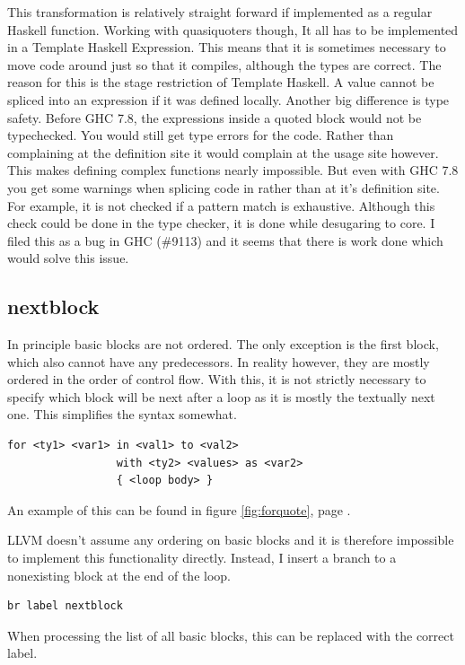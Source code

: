 \documentclass[a4paper,bibliography=totocnumbered,parskip,headsepline]{scrbook}
\begin{document}
This transformation is relatively straight forward if implemented as a regular Haskell function.
Working with quasiquoters though, It all has to be implemented in a Template Haskell Expression.
This means that it is sometimes necessary to move code around just so that it compiles, although the types are correct.
The reason for this is the stage restriction of Template Haskell.
A value cannot be spliced into an expression if it was defined locally.
Another big difference is type safety.
Before GHC 7.8, the expressions inside a quoted block would not be typechecked.
You would still get type errors for the code.
Rather than complaining at the definition site it would complain at the usage site however.
This makes defining complex functions nearly impossible.
But even with GHC 7.8 you get some warnings when splicing code in rather than at it's definition site.
For example, it is not checked if a pattern match is exhaustive.
Although this check could be done in the type checker, it is done while desugaring to core.
I filed this as a bug in GHC (\#9113) and it seems that there is work done which would solve this issue.

\subsection{nextblock}
In principle basic blocks are not ordered.
The only exception is the first block, which also cannot have any predecessors.
In reality however, they are mostly ordered in the order of control flow.
With this, it is not strictly necessary to specify which block will be next after a loop as it is mostly the textually next one.
This simplifies the syntax somewhat.

\begin{lstlisting}[numbers=none]
for <ty1> <var1> in <val1> to <val2>
                 with <ty2> <values> as <var2>
                 { <loop body> }
\end{lstlisting}

An example of this can be found in figure \ref{fig:forquote}, page \pageref{fig:forquote}.

LLVM doesn't assume any ordering on basic blocks and it is therefore impossible to implement this functionality directly.
Instead, I insert a branch to a nonexisting block at the end of the loop.
\begin{lstlisting}
br label nextblock
\end{lstlisting}
When processing the list of all basic blocks, this can be replaced with the correct label.
\end{document}
